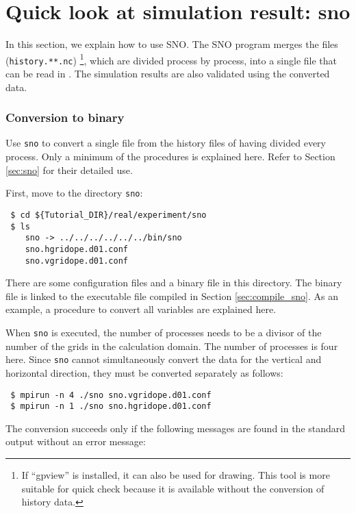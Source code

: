 \section{Quick look at simulation result: sno} \label{sec:quicklook}

In this section, we explain how to use SNO.
The SNO program merges the \netcdf files (\verb|history.**.nc|)
\footnote{If ``gpview'' is installed, it can also be used for drawing.
This tool is more suitable for quick check  because it is available without the conversion of history data.},
which are divided process by process, into a single \netcdf file that can be read in \grads.
The simulation results are also validated using the converted \netcdf data.

\subsubsection{Conversion to \grads binary}
Use \verb|sno| to convert a single \netcdf file from the history files of \netcdf having divided every process.
Only a minimum of the procedures is explained here. Refer to Section \ref{sec:sno} for their detailed use.

First, move to the directory \verb|sno|:
\begin{verbatim}
 $ cd ${Tutorial_DIR}/real/experiment/sno
 $ ls
    sno -> ../../../../../../bin/sno
    sno.hgridope.d01.conf
    sno.vgridope.d01.conf
\end{verbatim}
There are some configuration files and a binary file in this directory.
The binary file is linked to the executable file compiled in Section \ref{sec:compile_sno}.
As an example, a procedure to convert all variables are explained here.
 
When \verb|sno| is executed, the number of processes needs to be a divisor of the number of the grids in the calculation domain. 
The number of processes is four here.
Since \verb|sno| cannot simultaneously convert the data for the vertical and horizontal direction,
they must be converted separately as follows:
\begin{verbatim}
 $ mpirun -n 4 ./sno sno.vgridope.d01.conf
 $ mpirun -n 1 ./sno sno.hgridope.d01.conf
\end{verbatim}
The conversion succeeds only if the following messages are found in the standard output without an error message:


